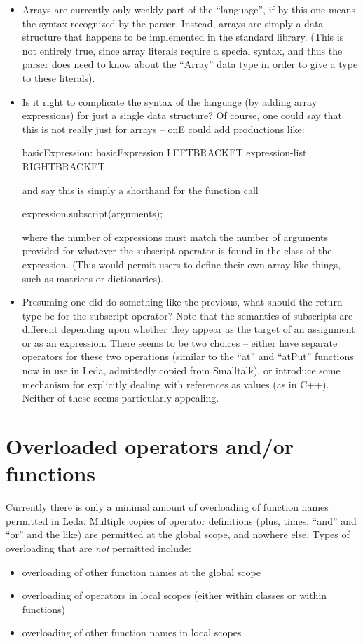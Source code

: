 \begin{itemize}
\item
Arrays are currently only weakly part of the ``language'', if by this
one means the syntax recognized by the parser.  Instead, arrays are
simply a data structure that happens to be implemented in the standard
library.  (This is not entirely true, since array literals require
a special syntax, and thus the parser does need to know about the
``Array'' data type in order to give a type to these literals).
\item
Is it right to complicate the syntax of the language (by adding array
expressions) for just a single data structure?  Of course, one could
say that this is not really just for arrays -- onE could add productions
like:
\begin{cprog}

basicExpression:
	basicExpression LEFTBRACKET expression-list RIGHTBRACKET

\end{cprog}\noindent
and say this is simply a shorthand for the function call
\begin{cprog}

	expression.subscript(arguments);

\end{cprog}
where the number of expressions must match the number of arguments provided
for whatever the subscript operator is found in the class of the expression.
(This would permit users to define their own array-like things, such
as matrices or dictionaries).
\item
Presuming one did do something like the previous, what should the return
type be for the subscript operator?  Note that the semantics of
subscripts are different depending upon whether they appear as the
target of an assignment or as an expression.
There seems to be two choices -- either have separate operators
for these two operations (similar to the ``at'' and ``atPut'' functions
now in use in Leda, admittedly copied from Smalltalk), or introduce
some mechanism for explicitly
dealing with references as values (as in C++).  Neither of these seems
particularly appealing.
\end{itemize}

\section{Overloaded operators and/or functions}

Currently there is only a minimal amount of overloading of function
names permitted in Leda.  Multiple copies of operator
definitions (plus, times, ``and'' and ``or'' and the like) are permitted
at the global scope, and nowhere else.  Types of overloading that
are {\em not} permitted include:
\begin{itemize}
\item
overloading of other function names at the global scope
\item
overloading of operators in local scopes (either within classes or within
functions)
\item
overloading of other function names in local scopes
\end{itemize}

